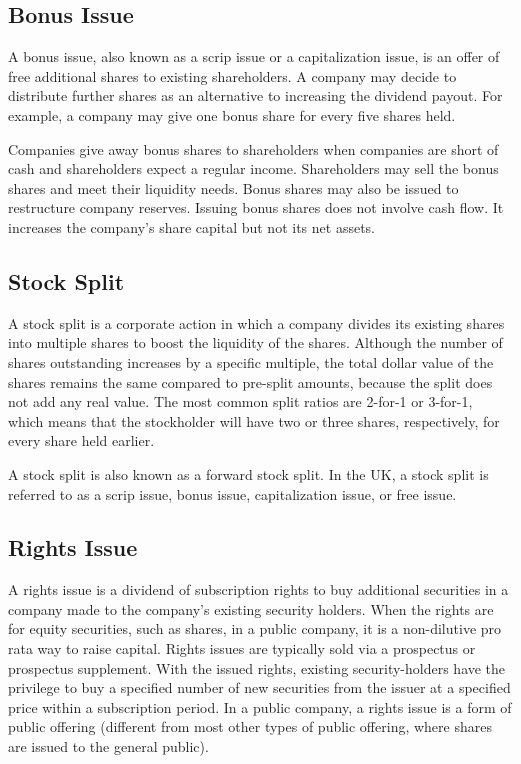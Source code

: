 \subsection{Bonus Issue}
A bonus issue, also known as a scrip issue or a capitalization issue, is an offer of free additional shares to existing shareholders. A company may decide to distribute further shares as an alternative to increasing the dividend payout. For example, a company may give one bonus share for every five shares held.

Companies give away bonus shares to shareholders when companies are short of cash and shareholders expect a regular income. Shareholders may sell the bonus shares and meet their liquidity needs. Bonus shares may also be issued to restructure company reserves. Issuing bonus shares does not involve cash flow. It increases the company’s share capital but not its net assets.


\subsection{Stock Split}
A stock split is a corporate action in which a company divides its existing shares into multiple shares to boost the liquidity of the shares. Although the number of shares outstanding increases by a specific multiple, the total dollar value of the shares remains the same compared to pre-split amounts, because the split does not add any real value. The most common split ratios are 2-for-1 or 3-for-1, which means that the stockholder will have two or three shares, respectively, for every share held earlier.

A stock split is also known as a forward stock split. In the UK, a stock split is referred to as a scrip issue, bonus issue, capitalization issue, or free issue.


\subsection{Rights Issue}
A rights issue is a dividend of subscription rights to buy additional securities in a company made to the company's existing security holders. When the rights are for equity securities, such as shares, in a public company, it is a non-dilutive pro rata way to raise capital. Rights issues are typically sold via a prospectus or prospectus supplement. With the issued rights, existing security-holders have the privilege to buy a specified number of new securities from the issuer at a specified price within a subscription period. In a public company, a rights issue is a form of public offering (different from most other types of public offering, where shares are issued to the general public).

